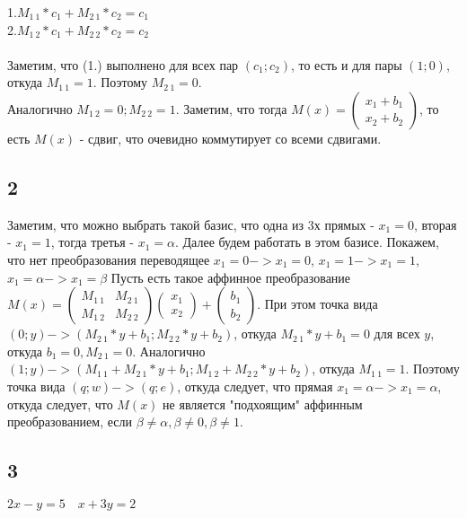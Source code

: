 		1.$M_{1\ 1}*c_1 + M_{2\ 1}*c_2 = c_1$ \\
		2.$M_{1\ 2}*c_1 + M_{2\ 2}*c_2 = c_2$ \\
		\\
		Заметим, что (1.) выполнено для всех пар $(c_1;c_2)$, то есть и для пары $(1;0)$, откуда $M_{1\ 1} = 1$. Поэтому $M_{2\ 1} = 0$.\\
		Аналогично $M_{1\ 2} = 0;M_{2\ 2} = 1$. Заметим, что тогда $M(x) = \begin{pmatrix} x_1 + b_1 \\ x_2 + b_2 \end{pmatrix}$, то есть $M(x)$ - сдвиг, что очевидно коммутирует со всеми сдвигами.
		
		\subsection{2}
		Заметим, что можно выбрать такой базис, что одна из 3х прямых - $x_1 = 0$, вторая - $x_1 = 1$, тогда третья - $x_1 = \alpha$. Далее будем работать в этом базисе. Покажем, что нет преобразования переводящее $x_1 = 0 -> x_1 = 0$, $x_1 = 1 -> x_1 = 1$, $x_1 = \alpha -> x_1 = \beta$ 
		Пусть есть такое аффинное преобразование $M(x) = \begin{pmatrix} M_{1\ 1} & M_{2\ 1} \\ M_{1\ 2} & M_{2\ 2} \end{pmatrix} \begin{pmatrix} x_1 \\ x_2 \end{pmatrix} + \begin{pmatrix} b_1 \\ b_2 \end{pmatrix}$. При этом точка вида $(0;y) -> (M_{2\ 1}*y + b_1; M_{2\ 2}*y + b_2)$, откуда $M_{2\ 1}*y + b_1 = 0$ для всех $y$, откуда $b_1 = 0, M_{2\ 1} = 0$. Аналогично $(1;y) -> (M_{1\ 1} + M_{2\ 1}*y + b_1; M_{1\ 2} + M_{2\ 2}*y + b_2)$, откуда $M_{1\ 1} = 1$. Поэтому точка вида $(q;w) -> (q;e)$, откуда следует, что прямая $x_1 = \alpha -> x_1 = \alpha$, откуда следует, что $M(x)$ не является "подхоящим" аффинным преобразованием, если $\beta \ne \alpha, \beta \ne 0, \beta \ne 1$.
		
		\subsection{3}
		$2x - y = 5 \quad x + 3y = 2$\\ 
		
